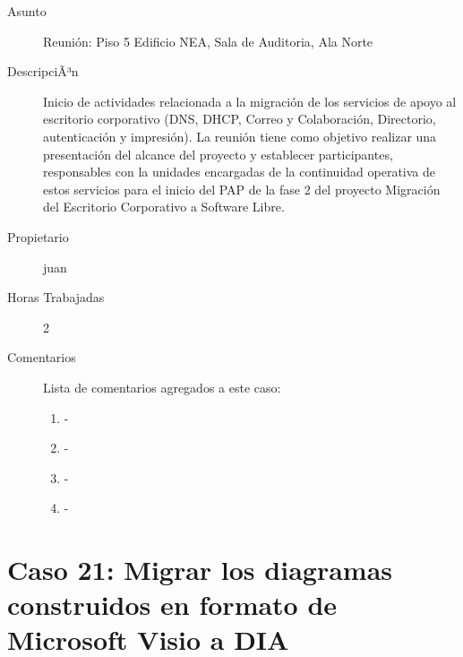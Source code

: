 \begin{description}

\item[Asunto] Reunión: Piso 5 Edificio NEA, Sala de Auditoria, Ala Norte\item[DescripciÃ³n] Inicio de actividades relacionada a la migración de los servicios de apoyo al
escritorio corporativo (DNS, DHCP, Correo y Colaboración, Directorio,
autenticación y impresión). La reunión tiene como objetivo realizar una
presentación del alcance del proyecto y establecer participantes, responsables
con la unidades encargadas de la continuidad operativa de estos servicios para
el inicio del PAP de la fase 2 del proyecto Migración del Escritorio
Corporativo a Software Libre.\item[Propietario] juan\item[Horas Trabajadas] 2

\item[Comentarios] Lista de comentarios agregados a este caso:  
\begin{enumerate}
        \item {\bfseries  } - {\bfseries } \\         \item {\bfseries  } - {\bfseries } \\         \item {\bfseries  } - {\bfseries } \\         \item {\bfseries  } - {\bfseries } \\     \end{enumerate}

\end{description}

\section{Caso 21: Migrar los diagramas construidos en formato de Microsoft Visio a DIA }

